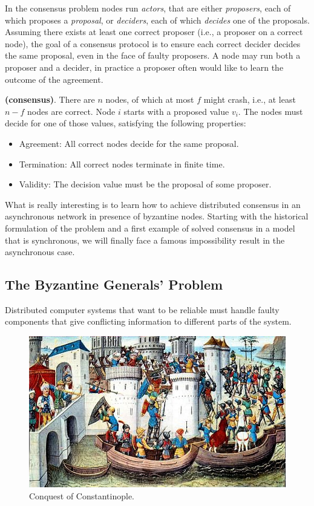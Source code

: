 \bigskip
\noindent
In the consensus problem nodes run \textit{actors}, that are either \textit{proposers}, each of which proposes a \textit{proposal}, or \textit{deciders}, each of which \textit{decides} one of the proposals. Assuming there exists at least one correct proposer
(i.e., a proposer on a correct node), the goal of a consensus protocol is to ensure each correct decider decides
the same proposal, even in the face of faulty proposers. A node may run both a proposer and a decider, in
practice a proposer often would like to learn the outcome of the agreement.
\begin{mydef} {\bf (consensus)}.\label{def:consensus}
    There are $n$ nodes, of which at most $f$ might crash, i.e., at least $n-f$ nodes are correct. Node $i$ starts with a proposed value $v_{i}$. The nodes must decide for one of those values, satisfying the following properties:
    \begin{itemize}
        \item Agreement: All correct nodes decide for the same proposal.
        \item Termination: All correct nodes terminate in finite time.
        \item Validity: The decision value must be the proposal of some proposer.
    \end{itemize}
\end{mydef}

\bigskip
\noindent
What is really interesting is to learn how to achieve distributed consensus in an asynchronous network in presence of byzantine nodes. Starting with the historical formulation of the problem and a first example of solved consensus in a model that is synchronous, we will finally face a famous impossibility result in the asynchronous case.

\bigskip
\subsection{The Byzantine Generals' Problem}
\label{sec:byzantine-generals}
Distributed computer systems that want to be reliable must handle faulty components that give conflicting information to different parts of the system.

\bigskip
\begin{figure}[h]
    \centering
	\includegraphics[width=0.9\linewidth]{Images/byzantine.jpeg}
	\caption{Conquest of Constantinople.}
	\label{fig:generals}
\end{figure}

